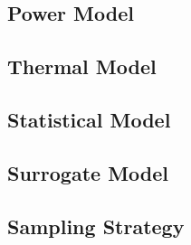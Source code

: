 \subsection{Power Model} 


\subsection{Thermal Model} 


\subsection{Statistical Model} 


\subsection{Surrogate Model} 


\subsection{Sampling Strategy} 

